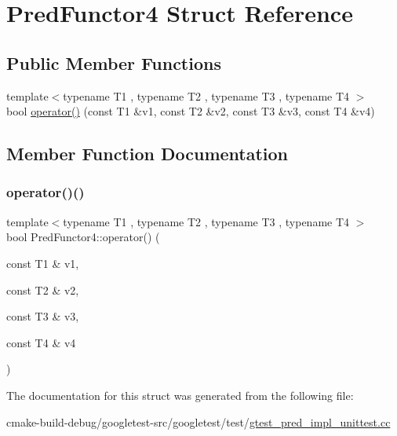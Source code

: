 \hypertarget{structPredFunctor4}{}\section{Pred\+Functor4 Struct Reference}
\label{structPredFunctor4}
\subsection*{Public Member Functions}
\begin{DoxyCompactItemize}
\item 
{\footnotesize template$<$typename T1 , typename T2 , typename T3 , typename T4 $>$ }\\bool \mbox{\hyperlink{structPredFunctor4_a6cfb6ccd9a66bf93d9c43a49575e3869}{operator()}} (const T1 \&v1, const T2 \&v2, const T3 \&v3, const T4 \&v4)
\end{DoxyCompactItemize}


\subsection{Member Function Documentation}
\mbox{\label{structPredFunctor4_a6cfb6ccd9a66bf93d9c43a49575e3869}} 
\subsubsection{\texorpdfstring{operator()()}{operator()()}}
{\footnotesize\ttfamily template$<$typename T1 , typename T2 , typename T3 , typename T4 $>$ \\
bool Pred\+Functor4\+::operator() (\begin{DoxyParamCaption}\item[{const T1 \&}]{v1,  }\item[{const T2 \&}]{v2,  }\item[{const T3 \&}]{v3,  }\item[{const T4 \&}]{v4 }\end{DoxyParamCaption})\hspace{0.3cm}{\ttfamily [inline]}}



The documentation for this struct was generated from the following file\+:\begin{DoxyCompactItemize}
\item 
cmake-\/build-\/debug/googletest-\/src/googletest/test/\mbox{\hyperlink{gtest__pred__impl__unittest_8cc}{gtest\+\_\+pred\+\_\+impl\+\_\+unittest.\+cc}}\end{DoxyCompactItemize}
